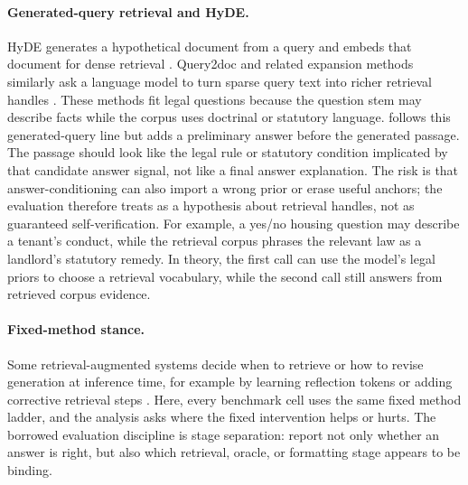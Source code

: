 \paragraph{Generated-query retrieval and HyDE.}
HyDE generates a hypothetical document from a query and embeds that document
for dense retrieval \citep{gao2023hyde}. Query2doc and related expansion
methods similarly ask a language model to turn sparse query text into richer
retrieval handles \citep{wang2023query2doc}. These methods fit
legal questions because the question stem may describe facts while the corpus
uses doctrinal or statutory language. \hyre{} follows this generated-query
line but adds a preliminary answer before the generated passage. The passage
should look like the legal rule or statutory condition implicated by that
candidate answer signal, not like a final answer explanation. The risk is that
answer-conditioning can also import a wrong prior or erase useful anchors; the
evaluation therefore treats \hyre{} as a hypothesis about retrieval handles, not
as guaranteed self-verification. For example, a yes/no housing question may describe a
tenant's conduct, while the retrieval corpus phrases the relevant law as a
landlord's statutory remedy. In theory, the first
call can use the model's legal priors to choose a retrieval vocabulary, while
the second call still answers from retrieved corpus evidence.

\paragraph{Fixed-method stance.}
Some retrieval-augmented systems decide when to retrieve or how to revise
generation at inference time, for example by learning reflection tokens or
adding corrective retrieval steps \citep{asai2024selfrag,jiang2023flare,yan2024crag}.
Here, every benchmark cell uses the same fixed method ladder, and the analysis
asks where the fixed \hyre{} intervention helps or hurts. The borrowed
evaluation discipline is
stage separation: report not only whether an answer is right, but also which
retrieval, oracle, or formatting stage appears to be binding.

